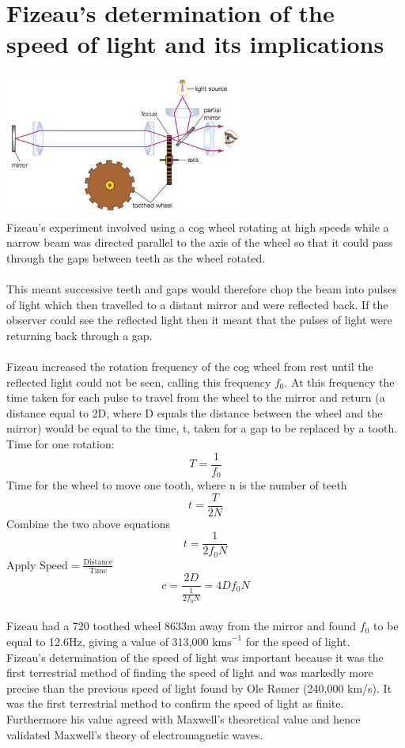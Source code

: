 \documentclass[12pt]{article}
\begin{document}
\section{Fizeau's determination of the speed of light and its implications}
\includegraphics[width=8cm]{fizeau.JPG}\\
Fizeau’s experiment involved using a cog wheel rotating at high speeds while a narrow beam was directed parallel to the axis of the wheel so that it could pass through the gaps between teeth as the wheel rotated.\\
\\
This meant successive teeth and gaps would therefore chop the beam into pulses of light which then travelled to a distant mirror and were reflected back. If the observer could see the reflected light then it meant that the pulses of light were returning back through a gap.\\
\\
Fizeau increased the rotation frequency of the cog wheel from rest until the reflected light could not be seen, calling this frequency $f_0$. At this frequency the time taken for each pulse to travel from the wheel to the mirror and return (a distance equal to 2D, where D equals the distance between the wheel and the mirror) would be equal to the time, t, taken for a gap to be replaced by a tooth.
\newpage
Time for one rotation:
$$T=\frac{1}{f_0}$$
Time for the wheel to move one tooth, where n is the number of teeth
$$t=\frac{T}{2N}$$
Combine the two above equations
$$t=\frac{1}{2f_0N}$$
Apply $\textrm{Speed}=\frac{\textrm{Distance}}{\textrm{Time}}$
$$c=\frac{2D}{\frac{1}{2f_0N}}=4Df_0N$$
\\
Fizeau had a 720 toothed wheel 8633m away from the mirror and found $f_0$ to be equal to 12.6Hz, giving a value of 313,000 $\textrm{kms}^{-1}$ for the speed of light.\\
Fizeau’s determination of the speed of light was important because it was the first terrestrial method of finding the speed of light and was markedly more precise than the previous speed of light found by Ole Rømer (240,000 km/s). It was the first terrestrial method to confirm the speed of light as finite. Furthermore his value agreed with Maxwell’s theoretical value and hence validated Maxwell’s theory of electromagnetic waves.
\end{document}
